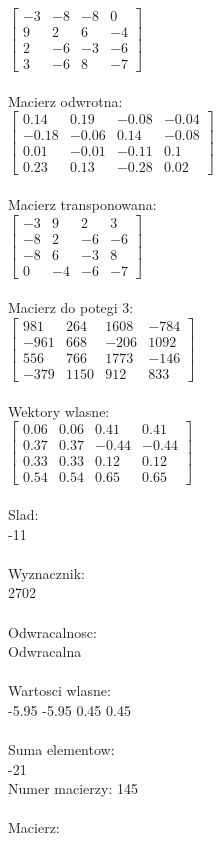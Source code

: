 \documentclass[a4paper,12pt]{article}
\begin{document}
$\begin{bmatrix} -3&-8&-8&0\\9&2&6&-4\\2&-6&-3&-6\\3&-6&8&-7 \end{bmatrix}$
\\
\\
Macierz odwrotna:\\

$\begin{bmatrix} 0.14&0.19&-0.08&-0.04\\-0.18&-0.06&0.14&-0.08\\0.01&-0.01&-0.11&0.1\\0.23&0.13&-0.28&0.02 \end{bmatrix}$
\\
\\
Macierz transponowana:\\

$\begin{bmatrix} -3&9&2&3\\-8&2&-6&-6\\-8&6&-3&8\\0&-4&-6&-7 \end{bmatrix}$
\\
\\
Macierz do potegi 3:\\

$\begin{bmatrix} 981&264&1608&-784\\-961&668&-206&1092\\556&766&1773&-146\\-379&1150&912&833 \end{bmatrix}$
\\
\\
Wektory wlasne:\\

$\begin{bmatrix} 0.06&0.06&0.41&0.41\\0.37&0.37&-0.44&-0.44\\0.33&0.33&0.12&0.12\\0.54&0.54&0.65&0.65 \end{bmatrix}$
\\
\\
Slad:\\
-11
\\
\\
Wyznacznik:\\
2702
\\
\\
Odwracalnosc:\\
Odwracalna
\\
\\
Wartosci wlasne:\\
-5.95 -5.95 0.45 0.45
\\
\\
Suma elementow:\\
-21
\\
\newpage
Numer macierzy:
145
\\
\\
Macierz:\\
\end{document}
